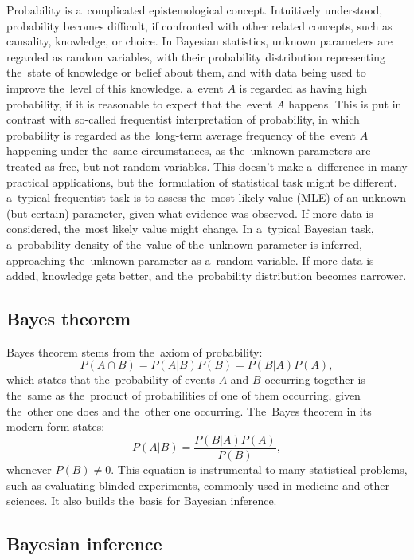 Probability is a~complicated epistemological concept. Intuitively understood, probability becomes difficult, if confronted with other related concepts, such as causality, knowledge, or choice. In Bayesian statistics, unknown parameters are regarded as random variables, with their probability distribution representing the~state of knowledge or belief about them, and with data being used to improve the~level of this knowledge. a~event $A$ is regarded as having high probability, if it is reasonable to expect that the~event $A$ happens. This is put in contrast with so-called frequentist interpretation of probability, in which probability is regarded as the~long-term average frequency of the~event $A$ happening under the~same circumstances, as the~unknown parameters are treated as free, but not random variables. This doesn't make a~difference in many practical applications, but the~formulation of statistical task might be different. a~typical frequentist task is to assess the~most likely value (MLE) of an unknown (but certain) parameter, given what evidence was observed. If more data is considered, the~most likely value might change. In a~typical Bayesian task, a~probability density of the~value of the~unknown parameter is inferred, approaching the~unknown parameter as a~random variable. If more data is added, knowledge gets better, and the~probability distribution becomes narrower.

\subsection{Bayes theorem}

Bayes theorem stems from the~axiom of probability:
\begin{equation}
    P(A \cap B) = P(A|B)P(B) = P(B|A)P(A),
\end{equation}
which states that the~probability of events $A$ and $B$ occurring together is the~same as the~product of probabilities of one of them occurring, given the~other one does and the~other one occurring. The~Bayes theorem  \citep{bayes1763essay} in its modern form states:
\begin{equation}
    P(A|B) = \frac{P(B|A)P(A)}{P(B)},
    \label{eq:bayes_theorem}
\end{equation}
whenever $P(B) \neq 0$. This equation is instrumental to many statistical problems, such as evaluating blinded experiments, commonly used in medicine and other sciences. It also builds the~basis for Bayesian inference.

\subsection{Bayesian inference}

